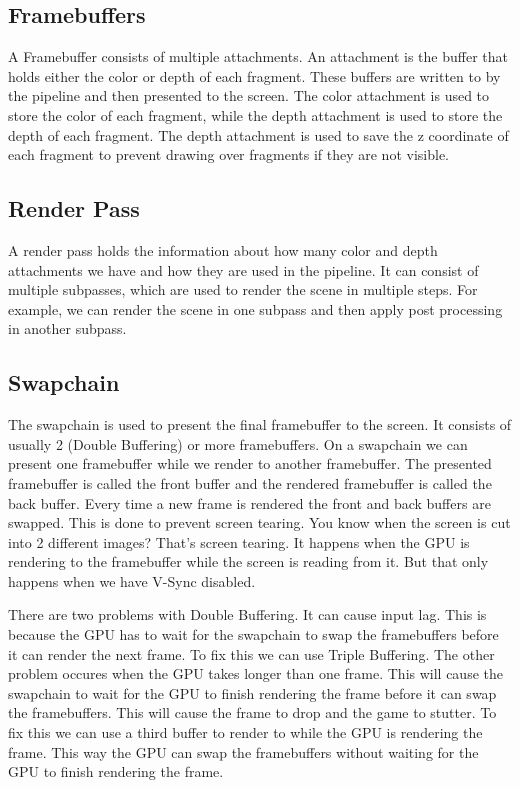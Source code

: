 \documentclass[12pt]{report} \usepackage{preamble}
\begin{document}
\subsection{Framebuffers}

A Framebuffer consists of multiple attachments. An attachment is the buffer that holds either the color or depth of each fragment.
These buffers are written to by the pipeline and then presented to the screen.
The color attachment is used to store the color of each fragment, while the depth attachment is used to store the depth of each fragment.
The depth attachment is used to save the z coordinate of each fragment to prevent drawing over fragments if they are not visible. \cite{framebuffers}

\subsection{Render Pass}

A render pass holds the information about how many color and depth attachments we have and how they are used in the pipeline.
It can consist of multiple subpasses, which are used to render the scene in multiple steps. For example, we can render the scene
in one subpass and then apply post processing in another subpass. \cite{render-pass}

\subsection{Swapchain}

The swapchain is used to present the final framebuffer to the screen. It consists of usually 2 (Double Buffering) or more framebuffers.
On a swapchain we can present one framebuffer while we render to another framebuffer.
The presented framebuffer is called the front buffer and the rendered framebuffer is called the back buffer.
Every time a new frame is rendered the front and back buffers are swapped. This is done to prevent screen tearing.
You know when the screen is cut into 2 different images? That's screen tearing. It happens when the GPU is rendering to the framebuffer
while the screen is reading from it. But that only happens when we have V-Sync disabled.

There are two problems with Double Buffering. It can cause input lag. This is because the GPU has to wait for the swapchain to swap the framebuffers
before it can render the next frame. To fix this we can use Triple Buffering. The other problem occures when the GPU takes longer than one frame.
This will cause the swapchain to wait for the GPU to finish rendering the frame before it can swap the framebuffers. This will cause the frame
to drop and the game to stutter. To fix this we can use a third buffer to render to while the GPU is rendering the frame. This way the GPU can
swap the framebuffers without waiting for the GPU to finish rendering the frame. \cite{swapchain}
\end{document}
